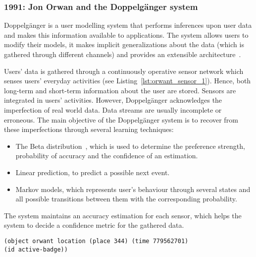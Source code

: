 \subsubsection{1991: Jon Orwan and the Doppelgänger system}
\label{sec:orwant_doppelganger}

Doppelgänger is a user modelling system that performs inferences upon user data
and makes this information available to applications. The system allows users to
modify their models, it makes implicit generalizations about the data (which is
gathered through different channels) and provides an extensible architecture~\citep{orwant_doppelgangeruser_1991}. 


Users' data is gathered through a continuously operative sensor network which
senses users' everyday activities (see Listing~\ref{lst:orwant_sensor_1}). Hence,
both long-term and short-term information about the user are stored. Sensors are
integrated in users' activities. However, Doppelgänger acknowledges the imperfection
of real world data. Data streams are usually incomplete or erroneous. The main
objective of the Doppelgänger system is to recover from these imperfections through
several learning techniques:

\begin{itemize}
  \item The Beta distribution~\citep{drake_fundamentals_1967}, which is used to
  determine the preference strength, probability of accuracy and the confidence
  of an estimation.
  \item Linear prediction, to predict a possible next event.
  \item Markov models, which represents user's behaviour through several states and
  all possible transitions between them with the corresponding probability.
\end{itemize}


The system maintains an accuracy estimation for each sensor, which helps the
system to decide a confidence metric for the gathered data.

\begin{verbatim}
(object orwant location (place 344) (time 779562701) 
(id active-badge))
\end{verbatim}



